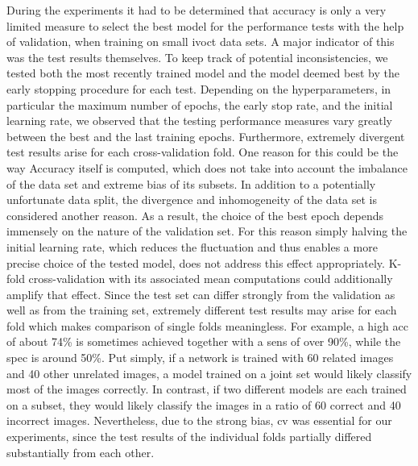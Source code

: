 During the experiments it had to be determined that accuracy is only a very limited measure to select the best model for the performance tests with the help of validation, when training on small \acrshort{ivoct} data sets. A major indicator of this was the test results themselves. To keep track of potential inconsistencies, we tested both the most recently trained model and the model deemed best by the early stopping procedure for each test. Depending on the hyperparameters, in particular the maximum number of epochs, the early stop rate, and the initial learning rate, we observed that the testing performance measures vary greatly between the best and the last training epochs. Furthermore, extremely divergent test results arise for each cross-validation fold. One reason for this could be the way Accuracy itself is computed, which does not take into account the imbalance of the data set and extreme bias of its subsets. In addition to a potentially unfortunate data split, the divergence and inhomogeneity of the data set is considered another reason. As a result, the choice of the best epoch depends immensely on the nature of the validation set. For this reason simply halving the initial learning rate, which reduces the fluctuation and thus enables a more precise choice of the tested model, does not address this effect appropriately. K-fold cross-validation with its associated mean computations could additionally amplify that effect. Since the test set can differ strongly from the validation as well as from the training set, extremely different test results may arise for each fold which makes comparison of single folds meaningless. For example, a high \acrshort{acc} of about 74\% is sometimes achieved together with a \acrshort{sens} of over 90\%, while the \acrshort{spec} is around 50\%. Put simply, if a network is trained with 60 related images and 40 other unrelated images, a model trained on a joint set would likely classify most of the images correctly. In contrast, if two different models are each trained on a subset, they would likely classify the images in a ratio of 60 correct and 40 incorrect images. Nevertheless, due to the strong bias, \acrshort{cv} was essential for our experiments, since the test results of the individual folds partially differed substantially from each other.

